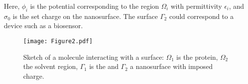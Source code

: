 \noindent Here, $\phi_i$ is the potential corresponding to the region $\Omega_i$ with permittivity $\epsilon_i$, and $\sigma_0$ is the set charge on the nanosurface. The surface $\Gamma_2$ could correspond to a device such as a biosensor.

\begin{figure}
   \texttt{[image: Figure2.pdf]} 
   \caption{Sketch of a molecule interacting with a surface: $\Omega_1$ is the protein, $\Omega_2$ the solvent region, $\Gamma_1$ is the  \ses and $\Gamma_2$ a nanosurface with imposed charge.}
   \label{fig:molecule_surface}
\end{figure}
